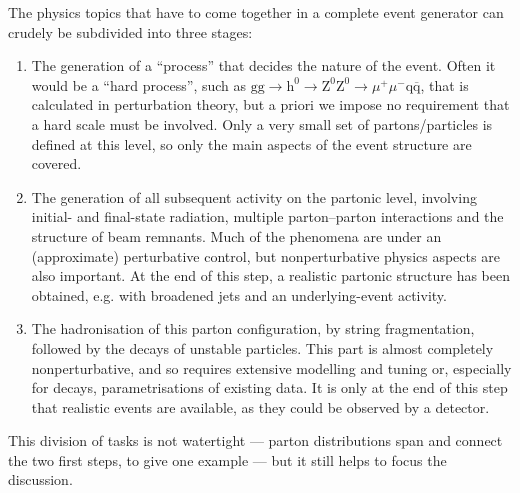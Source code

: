 \documentclass{elsartmod}
\begin{document}
The physics topics that have to come together in a complete 
event generator can crudely be subdivided into three stages:
\begin{enumerate}
\item The generation of a ``process'' that decides the nature of the
event. Often it would be a ``hard process'', such as $\mathrm{g}
\mathrm{g} \to \mathrm{h}^0 \to \mathrm{Z}^0 \mathrm{Z}^0 \to \mu^+
\mu^- \mathrm{q} \overline{\mathrm{q}}$, that is calculated in
perturbation theory, but a priori we impose no requirement that a hard
scale must be involved. Only a very small set of
partons/particles is defined at this level, so only the main aspects
of the event structure are covered.
\item The generation of all subsequent activity on the partonic level, 
involving initial- and final-state radiation, multiple parton--parton 
interactions and the structure of beam remnants. Much of the phenomena
are under an (approximate) perturbative control, but nonperturbative
physics aspects are also important. At the end of this step, a realistic
partonic structure has been obtained, e.g. with broadened jets and
an underlying-event activity.  
\item The hadronisation of this parton configuration, by string
fragmentation, followed by the decays of unstable particles. This
part is almost completely nonperturbative, and so requires extensive
modelling and tuning or, especially for decays, parametrisations of 
existing data. It is only at the end of this step that realistic events 
are available, as they could be observed by a detector.
\end{enumerate}
This division of tasks is not watertight --- parton distributions span
and connect the two first steps, to give one example ---  but it still 
helps to focus the discussion. 
\end{document}
